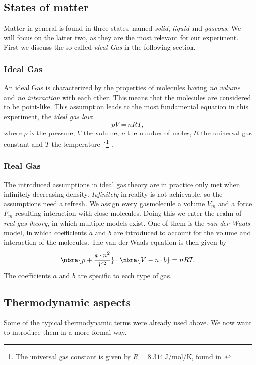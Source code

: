 \documentclass{subfiles}
\begin{document}
    \subsection{States of matter}

        Matter in general is found in three states, named \emph{solid}, \emph{liquid} and \emph{gaseous}. We will focus on the latter two, as they are the most relevant for our experiment. First we discuss the so called \emph{ideal Gas} in the following section. 

        \subsubsection*{Ideal Gas}
            An ideal Gas is characterized by the properties of molecules having \emph{no volume} and \emph{no interaction} with each other. This means that the molecules are considered to be point-like. This assumption leads to the most fundamental equation in this experiment, the \emph{ideal gas law}:
            \[
                pV = nRT,
            \]
            where $p$ is the pressure, $V$ the volume, $n$ the number of moles, $R$ the universal gas constant and $T$ the temperature ´\footnote{The universal gas constant is given by $R = \SI{8.314}{\joule\per\mole\per\kelvin}$, found in \cite{nist:gasconstant}.} \cite[p.11]{nolting42}. 

        \subsubsection*{Real Gas}
            The introduced assumptions in ideal gas theory are in practice only met when infinitely decreasing density. \emph{Infinitely} in reality is not achievable, so the assumptions need a refresh. We assign every gasmolecule a volume $V_m$ and a force $F_m$ resulting interaction with close molecules. Doing this we enter the realm of \emph{real gas theory}, in which multiple models exist. One of them is the \emph{van der Waals} model, in which coefficients $a$ and $b$ are introduced to account for the volume and interaction of the molecules. The van der Waals equation is then given by
            \[\nbra{p + \frac{a\cdot n^2}{V^2}} \cdot \nbra{V - n\cdot b} = nRT.\]
            The coefficients $a$ and $b$ are specific to each type of gas. \cite[p.13]{nolting42}
    
    \subsection{Thermodynamic aspects}
        Some of the typical thermodynamic terms were already used above. We now want to introduce them in a more formal way.
\end{document}
